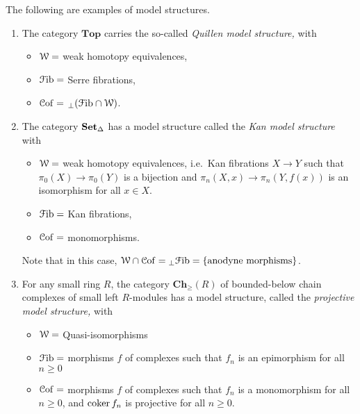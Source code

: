 \documentclass[main.tex]{subfiles}
\begin{document}
\begin{example}
  \label{eg:model_categories}
  The following are examples of model structures.
  \begin{enumerate}
    \item The category $\mathbf{Top}$ carries the so-called \emph{Quillen model structure,} with
      \begin{itemize}
        \item $\mathcal{W} =$ weak homotopy equivalences,

        \item $\mathcal{F}\mathrm{ib} =$ Serre fibrations,

        \item $\mathcal{C}\mathrm{of} =$ ${}_{\perp}(\mathcal{F}\mathrm{ib} \cap \mathcal{W})$.
      \end{itemize}

    \item The category $\operatorname{\mathbf{Set}_{\Delta}}$ has a model structure called the \emph{Kan model structure} with
      \begin{itemize}
        \item $\mathcal{W} =$ weak homotopy equivalences, i.e.\ Kan fibrations $X \to Y$ such that $\pi_{0}(X) \to \pi_{0}(Y)$ is a bijection and $\pi_{n}(X, x) \to \pi_{n}(Y, f(x))$ is an isomorphism for all $x \in X$.

        \item $\mathcal{F}\mathrm{ib} =$ Kan fibrations,

        \item $\mathcal{C}\mathrm{of} =$ monomorphisms.
      \end{itemize}

      Note that in this case, $\mathcal{W} \cap \mathcal{C}\mathrm{of} = {}_{\perp}\mathcal{F}\mathrm{ib} = \{\text{anodyne morphisms}\}$.

    \item For any small ring $R$, the category $\mathbf{Ch}_{\geq}(R)$ of bounded-below chain complexes of small left $R$-modules has a model structure, called the \emph{projective model structure,} with
      \begin{itemize}
        \item $\mathcal{W} = $ Quasi-isomorphisms

        \item $\mathcal{F}\mathrm{ib} = $ morphisms $f$ of complexes such that $f_{n}$ is an epimorphism for all $n \geq 0$

        \item $\mathcal{C}\mathrm{of} = $ morphisms $f$ of complexes such that $f_{n}$ is a monomorphism for all $n \geq 0$, and $\operatorname{coker} f_{n}$ is projective for all $n \geq 0$.
      \end{itemize}


\end{enumerate}
\end{example}
\end{document}
